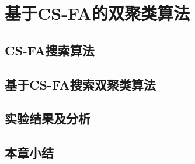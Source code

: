 \chapter{基于CS-FA的双聚类算法}

\section{CS-FA搜索算法}

\section{基于CS-FA搜索双聚类算法}

\section{实验结果及分析}

\section{本章小结}